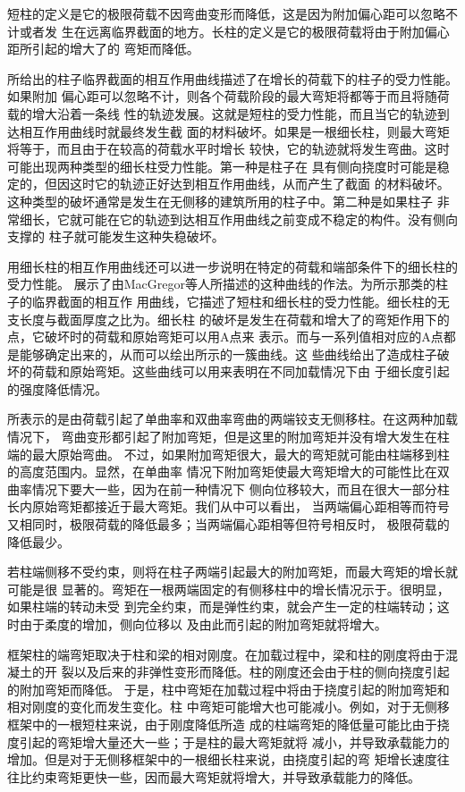 \documentclass[12pt,a4paper]{book}
\begin{document}
短柱的定义是它的极限荷载不因弯曲变形而降低，这是因为附加偏心距可以忽略不计或者发
生在远离临界截面的地方。长柱的定义是它的极限荷载将由于附加偏心距所引起的增大了的
弯矩而降低。

所给出的柱子临界截面的相互作用曲线描述了在增长的荷载下的柱子的受力性能。如果附加
偏心距可以忽略不计，则各个荷载阶段的最大弯矩将都等于而且将随荷载的增大沿着一条线
性的轨迹发展。这就是短柱的受力性能，而且当它的轨迹到达相互作用曲线时就最终发生截
面的材料破坏。如果是一根细长柱，则最大弯矩将等于，而且由于在较高的荷载水平时增长
较快，它的轨迹就将发生弯曲。这时可能出现两种类型的细长柱受力性能。第一种是柱子在
具有侧向挠度时可能是稳定的，但因这时它的轨迹正好达到相互作用曲线，从而产生了截面
的材料破坏。这种类型的破坏通常是发生在无侧移的建筑所用的柱子中。第二种是如果柱子
非常细长，它就可能在它的轨迹到达相互作用曲线之前变成不稳定的构件。没有侧向支撑的
柱子就可能发生这种失稳破坏。

用细长柱的相互作用曲线还可以进一步说明在特定的荷载和端部条件下的细长柱的受力性能。
展示了由MacGregor等人所描述的这种曲线的作法。为所示那类的柱子的临界截面的相互作
用曲线，它描述了短柱和细长柱的受力性能。细长柱的无支长度与截面厚度之比为。细长柱
的破坏是发生在荷载和增大了的弯矩作用下的点，它破坏时的荷载和原始弯矩可以用A点来
表示。而与一系列值相对应的A点都是能够确定出来的，从而可以绘出所示的一簇曲线。这
些曲线给出了造成柱子破坏的荷载和原始弯矩。这些曲线可以用来表明在不同加载情况下由
于细长度引起的强度降低情况。

所表示的是由荷载引起了单曲率和双曲率弯曲的两端铰支无侧移柱。在这两种加载情况下，
弯曲变形都引起了附加弯矩，但是这里的附加弯矩并没有增大发生在柱端的最大原始弯曲。
不过，如果附加弯矩很大，最大的弯矩就可能由柱端移到柱的高度范围内。显然，在单曲率
情况下附加弯矩使最大弯矩增大的可能性比在双曲率情况下要大一些，因为在前一种情况下
侧向位移较大，而且在很大一部分柱长内原始弯矩都接近于最大弯矩。我们从中可以看出，
当两端偏心距相等而符号又相同时，极限荷载的降低最多；当两端偏心距相等但符号相反时，
极限荷载的降低最少。

若柱端侧移不受约束，则将在柱子两端引起最大的附加弯矩，而最大弯矩的增长就可能是很
显著的。弯矩在一根两端固定的有侧移柱中的增长情况示于。很明显，如果柱端的转动未受
到完全约束，而是弹性约束，就会产生一定的柱端转动；这时由于柔度的增加，侧向位移以
及由此而引起的附加弯矩就将增大。

框架柱的端弯矩取决于柱和梁的相对刚度。在加载过程中，梁和柱的刚度将由于混凝土的开
裂以及后来的非弹性变形而降低。柱的刚度还会由于柱的侧向挠度引起的附加弯矩而降低。
于是，柱中弯矩在加载过程中将由于挠度引起的附加弯矩和相对刚度的变化而发生变化。柱
中弯矩可能增大也可能减小。例如，对于无侧移框架中的一根短柱来说，由于刚度降低所造
成的柱端弯矩的降低量可能比由于挠度引起的弯矩增大量还大一些；于是柱的最大弯矩就将
减小，并导致承载能力的增加。但是对于无侧移框架中的一根细长柱来说，由挠度引起的弯
矩增长速度往往比约束弯矩更快一些，因而最大弯矩就将增大，并导致承载能力的降低。
\end{document}
